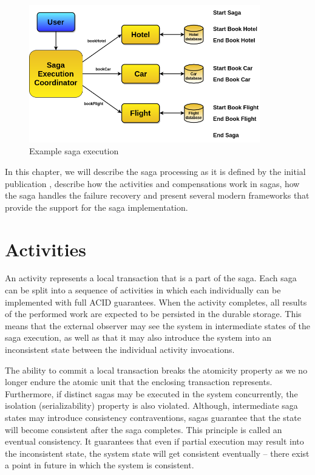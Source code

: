 \documentclass[oneside,
  digital, %
  table,   %
  nolof,     %
  nolot,     %
]{fithesis3}
\begin{document}
\begin{figure}[h]
    \begin{center}
        \includegraphics[height=60mm]{images/tripExample.png}
    \end{center}
    \caption{Example saga execution}
    \label{fig:tripExample}
\end{figure}

In this chapter, we will describe the saga processing as it is defined by the initial publication \cite{sagas_publ}, describe how the activities and compensations work in sagas, how the saga handles the failure recovery and present several modern frameworks that provide the support for the saga implementation.

\section{Activities}

An activity represents a local transaction that is a part of the saga. Each saga can be split into a sequence of activities in which each individually can be implemented with full ACID guarantees. When the activity completes, all results of the performed work are expected to be persisted in the durable storage. This means that the external observer may see the system in intermediate states of the saga execution, as well as that it may also introduce the system into an inconsistent state between the individual activity invocations.

The ability to commit a local transaction breaks the atomicity property as we no longer endure the atomic unit that the enclosing transaction represents. Furthermore, if distinct sagas may be executed in the system concurrently, the isolation (serializability) property is also violated. Although, intermediate saga states may introduce consistency contraventions, sagas guarantee that the state will become consistent after the saga completes. This principle is called an eventual consistency. It guarantees that even if partial execution may result into the inconsistent state, the system state will get consistent eventually -- there exist a point in future in which the system is consistent.
\end{document}

